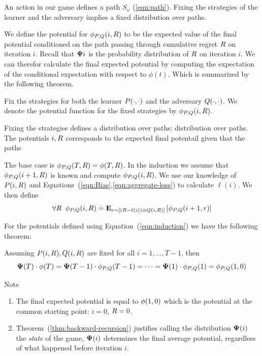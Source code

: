 \documentclass{article}[12pt]
\begin{document}
An action in our game defines a path $S_\omega$
(\ref{eqn:path}). Fixing the strategies of the learner and the
adversary implies a fixed distribution over paths.

We define the potential for $\phi_{P,Q}(i,R)$ to be the expected value of
the final potential conditioned on the path passing through cumulative
regret $R$ on iteration $i$. Recall that ${\bf \Psi}{i}$ is the
probability distribution of $R$ on iteration $i$. We can therefor
calculate the final expected potential by computing the expectation of
the conditional expectation with respect to $\phi(t)$. Which is
summarized by the following theorem.

Fix the strategies for both the learner $P(\cdot,\cdot)$ and
the adversary $Q(\cdot,\cdot)$. We denote the potential
function for the fixed strategies by $\phi_{P,Q}(i,R)$.

Fixing the strategies defines a distribution over paths:
distribution over paths. The potentials $i,R$ corresponds to the
expected final potentail given that the paths 

The base case is  $\phi_{P,Q}(T,R) = \phi(T,R)$.
In the induction we assume that  $\phi_{P,Q}(i+1,R)$ is known and compute  $\phi_{P,Q}(i,R)$.
We use our knowledge of $P(i,R)$ and
Equations~(\ref{eqn:Bias},\ref{eqn:aggregate-loss}) to calculate
$\ell(i)$. We then define 
\begin{equation} \label{eqn:induction}
  \forall R\;\;
  \phi_{P,Q}(i,R) \doteq {\bf E}_{r \sim [(R-\ell(i)) \oplus Q(i,R)]}\left[ \phi_{P,Q}(i+1,r) \right]
\end{equation}

For the potentials defined using Equation~(\ref{eqn:induction}) we have the
following theorem:

\begin{theorem} \label{thm:backward-recursion}
Assuming $ P(i,R), Q(i,R)$ are fixed for all
$i=1,\ldots,T-1$, then
\[
   {\bf \Psi}(T)\cdot \phi(T)=
   {\bf \Psi}(T-1)\cdot \phi_{P,Q}(T-1)= \cdots =
   {\bf \Psi}(1)\cdot \phi_{P,Q}(1)=\phi_{P,Q}(1,0)
  \]
\end{theorem}

Note
\begin{enumerate}
\item
  The final expected potential is equal to $\phi(1,0)$ which is the
  potential at the common starting point: $i=0$, $R=0$.
\item
  Theorem~(\ref{thm:backward-recursion}) justifies calling the
  distribution ${\bf \Psi}(i)$ the {\em state} of the game, ${\bf \Psi}(i)$
  determines the final average potential, regardless of what happened
  before iteration $i$.

\end{enumerate}
\end{document}
